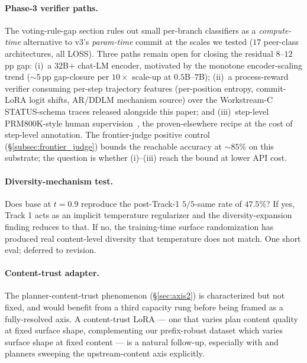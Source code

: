\paragraph{Phase-3 verifier paths.}  The voting-rule-gap section
rules out small per-branch classifiers as a \emph{compute-time}
alternative to v3's \emph{param-time} commit at the scales we
tested ($17$ peer-class architectures, all LOSS).  Three paths
remain open for closing the residual $8\text{--}12$\,pp gap:
(i)~a $32$B$+$ chat-LM encoder, motivated by the monotone
encoder-scaling trend ($\sim 5$\,pp gap-closure per $10\times$
scale-up at $0.5$B--$7$B); (ii)~a process-reward verifier consuming
per-step trajectory features (per-position entropy, commit-LoRA
logit shifts, AR/DDLM mechanism source) over the Workstream-C
STATUS-schema traces released alongside this paper; and
(iii)~step-level PRM800K-style human
supervision~\citep{lightman2023letsverify}, the proven-elsewhere
recipe at the cost of step-level annotation.  The frontier-judge
positive control (\S\ref{subsec:frontier_judge}) bounds the
reachable accuracy at $\sim 85\%$ on this substrate; the question
is whether (i)--(iii) reach the bound at lower API cost.

\paragraph{Diversity-mechanism test.}  Does base \LLaDA{} at
$t{=}0.9$ reproduce the post-Track-1 $5/5$-same rate of $47.5\%$?
If yes, Track 1 acts as an implicit temperature regularizer and
the diversity-expansion finding reduces to that.  If no, the
training-time surface randomization has produced real
content-level diversity that temperature does not match.  One
short eval; deferred to revision.

\paragraph{Content-trust adapter.}  The planner-content-trust
phenomenon (\S\ref{sec:axis2}) is characterized but not fixed,
and would benefit from a third capacity rung before being framed
as a fully-resolved axis.  A
content-trust LoRA --- one that varies plan content quality at
fixed surface shape, complementing our prefix-robust dataset
which varies surface shape at fixed content --- is a natural
follow-up, especially with  and  planners
sweeping the upstream-content axis explicitly.


